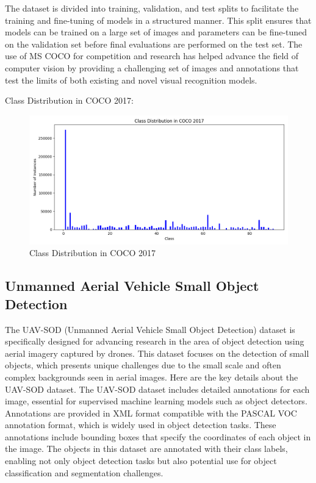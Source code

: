 The dataset is divided into training, validation, and test splits to facilitate the training and fine-tuning of models in a structured manner. 
This split ensures that models can be trained on a large set of images and parameters can be fine-tuned on the validation set before final evaluations 
are performed on the test set. The use of MS COCO for competition and research has helped advance the field of computer vision by providing a challenging 
set of images and annotations that test the limits of both existing and novel visual recognition models.

Class Distribution in COCO 2017:

\begin{figure}[h!]
    \centering
    \includegraphics[scale=0.55]{Figures/coco2017_class_distribution.png}
    \caption{Class Distribution in COCO 2017}
    \label{fig:coco-class}
\end{figure}

\subsection{Unmanned Aerial Vehicle Small Object Detection}

The UAV-SOD (Unmanned Aerial Vehicle Small Object Detection) dataset is specifically designed for advancing research in the area of object detection using 
aerial imagery captured by drones. This dataset focuses on the detection of small objects, which presents unique challenges due to the small scale and often 
complex backgrounds seen in aerial images. Here are the key details about the UAV-SOD dataset. The UAV-SOD dataset includes detailed annotations for each image, 
essential for supervised machine learning models such as object detectors. Annotations are provided in XML format compatible with the PASCAL VOC annotation 
format, which is widely used in object detection tasks. These annotations include bounding boxes that specify the coordinates of each object in the image. 
The objects in this dataset are annotated with their class labels, enabling not only object detection tasks but also potential use for object classification 
and segmentation challenges.

